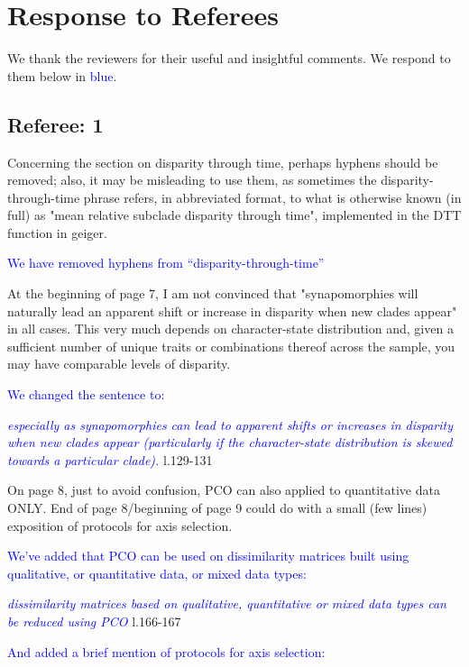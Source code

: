 \documentclass[12pt,letterpaper]{article}
\begin{document}
\section{Response to Referees}

We thank the reviewers for their useful and insightful comments. We respond to them below in \textcolor{blue}{blue}.

\subsection{Referee: 1}
\noindent Concerning the section on disparity through time, perhaps hyphens should be removed; also, it may be misleading to use them, as sometimes the disparity-through-time phrase refers, in abbreviated format, to what is otherwise known (in full) as "mean relative subclade disparity through time", implemented in the DTT function in geiger.

\textcolor{blue}{We have removed hyphens from ``disparity-through-time''}

\noindent At the beginning of page 7, I am not convinced that "synapomorphies will naturally lead an apparent shift or increase in disparity when new clades appear" in all cases. This very much depends on character-state distribution and, given a sufficient number of unique traits or combinations thereof across the sample, you may have comparable levels of disparity.

\textcolor{blue}{We changed the sentence to:}

\textcolor{blue}{\textit{especially as synapomorphies can lead to apparent shifts or increases in disparity when new clades appear (particularly if the character-state distribution is skewed towards a particular clade).}} l.129-131 %

\noindent On page 8, just to avoid confusion, PCO can also applied to quantitative data ONLY. End of page 8/beginning of page 9 could do with a small (few lines) exposition of protocols for axis selection.

\textcolor{blue}{We've added that PCO can be used on dissimilarity matrices built using qualitative, or quantitative data, or mixed data types:}

\textcolor{blue}{\textit{dissimilarity matrices based on qualitative, quantitative or mixed data types can be reduced using PCO}} l.166-167 %

\textcolor{blue}{And added a brief mention of protocols for axis selection:}
\end{document}
